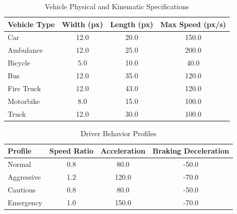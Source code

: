 \documentclass[../report_main.tex]{subfiles}
\begin{document}
\begin{table}[h]
\centering
\caption{Vehicle Physical and Kinematic Specifications}
\label{tab:vehicle_specs}
\begin{tabular}{|l|c|c|c|}
\hline
\textbf{Vehicle Type} & \textbf{Width (px)} & \textbf{Length (px)} & \textbf{Max Speed (px/s)} \\ \hline
Car                   & 12.0                & 20.0                 & 150.0                     \\ \hline
Ambulance             & 12.0                & 25.0                 & 200.0                     \\ \hline
Bicycle               & 5.0                 & 10.0                 & 40.0                      \\ \hline
Bus                   & 12.0                & 35.0                 & 120.0                     \\ \hline
Fire Truck            & 12.0                & 43.0                 & 120.0                     \\ \hline
Motorbike             & 8.0                 & 15.0                 & 100.0                     \\ \hline
Truck                 & 12.0                & 30.0                 & 100.0                     \\ \hline
\end{tabular}
\end{table}

\begin{table}[H]
\centering
\caption{Driver Behavior Profiles}
\label{tab:driver_profiles}
\begin{tabular}{|l|c|c|c|}
\hline
\textbf{Profile} & \textbf{Speed Ratio} & \textbf{Acceleration} & \textbf{Braking Deceleration} \\ \hline
Normal           & 0.8                  & 80.0                  & -50.0                         \\ \hline
Aggressive       & 1.2                  & 120.0                 & -70.0                         \\ \hline
Cautious         & 0.8                  & 80.0                  & -50.0                         \\ \hline
Emergency        & 1.0                  & 150.0                 & -70.0                         \\ \hline
\end{tabular}
\end{table}
\end{document}
